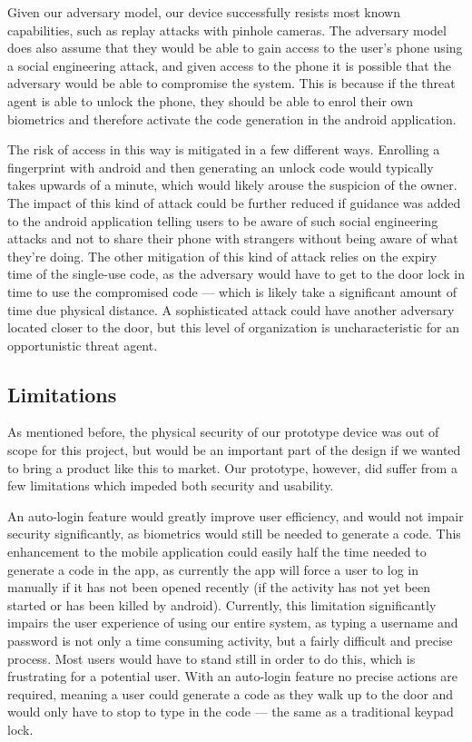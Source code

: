 \documentclass[conference]{IEEEtran}
\begin{document}
Given our adversary model, our device successfully resists most known capabilities, such as replay attacks with pinhole cameras.
The adversary model does also assume that they would be able to gain access to the user's phone using a social engineering attack, and given access to the phone it is possible that the adversary would be able to compromise the system.
This is because if the threat agent is able to unlock the phone, they should be able to enrol their own biometrics and therefore activate the code generation in the android application.

The risk of access in this way is mitigated in a few different ways.
Enrolling a fingerprint with android  and then generating an unlock code would typically takes upwards of a minute, which would likely arouse the suspicion of the owner.
The impact of this kind of attack could be further reduced if guidance was added to the android application telling users to be aware of such social engineering attacks and not to share their phone with strangers without being aware of what they're doing.
The other mitigation of this kind of attack relies on the expiry time of the single-use code, as the adversary would have to get to the door lock in time to use the compromised code --- which is likely take a significant amount of time due physical distance.
A sophisticated attack could have another adversary located closer to the door, but this level of organization is uncharacteristic for an opportunistic threat agent.

\subsection{Limitations}
As mentioned before, the physical security of our prototype device was out of scope for this project, but would be an important part of the design if we wanted to bring a product like this to market.
Our prototype, however, did suffer from a few limitations which impeded both security and usability.

An auto-login feature would greatly improve user efficiency, and would not impair security significantly, as biometrics would still be needed to generate a code.
This enhancement to the mobile application could easily half the time needed to generate a code in the app, as currently the app will force a user to log in manually if it has not been opened recently (if the activity has not yet been started or has been killed by android).
Currently, this limitation significantly impairs the user experience of using our entire system, as typing a username and password is not only a time consuming activity, but a fairly difficult and precise process.
Most users would have to stand still in order to do this, which is frustrating for a potential user.
With an auto-login feature no precise actions are required, meaning a user could generate a code as they walk up to the door and would only have to stop to type in the code --- the same as a traditional keypad lock.
\end{document}
